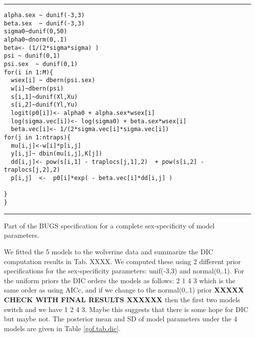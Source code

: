 \begin{panel}[htp]
\centering
\rule[0.15in]{\textwidth}{.03in}
{\small
\begin{verbatim}
alpha.sex ~ dunif(-3,3)
beta.sex  ~ dunif(-3,3)
sigma0~dunif(0,50)
alpha0~dnorm(0,.1)
beta<- (1/(2*sigma*sigma) )
psi ~ dunif(0,1)
psi.sex  ~ dunif(0,1)
for(i in 1:M){
  wsex[i] ~ dbern(psi.sex)
  w[i]~dbern(psi)
  s[i,1]~dunif(Xl,Xu)
  s[i,2]~dunif(Yl,Yu)
  logit(p0[i])<- alpha0 + alpha.sex*wsex[i]
  log(sigma.vec[i])<- log(sigma0) + beta.sex*wsex[i]
  beta.vec[i]<- 1/(2*sigma.vec[i]*sigma.vec[i])
for(j in 1:ntraps){
  mu[i,j]<-w[i]*p[i,j]
  y[i,j]~ dbin(mu[i,j],K[j])
  dd[i,j]<- pow(s[i,1] - traplocs[j,1],2)  + pow(s[i,2] - traplocs[j,2],2)
  p[i,j]  <-  p0[i]*exp( - beta.vec[i]*dd[i,j] )

}
}
\end{verbatim}
}
\rule[-0.15in]{\textwidth}{.03in}
\caption{
Part of the BUGS specification for a complete sex-specificity of model
parameters.   
}
\label{gof.panel.sexmodel}
\end{panel}


We fitted the 5 models to the wolverine data and summarize
the DIC computation results in Tab. XXXX.  We computed these using 2
different prior specifications for the sex-specificity parameters:
unif(-3,3) and normal(0,.1). For the uniform priors the DIC orders the
models as follows: 2 1 4 3 which is the same order as using AICc, and if we change to the normal(0,.1) prior
{\bf XXXXX CHECK WITH FINAL RESULTS XXXXXX}
then the first two models switch and we have 1 2 4 3.  Maybe this
suggests that there is some hope for DIC but maybe not. 
The posterior mean and SD of model parameters under the 4 models are
given in Table \ref{gof.tab.dic}.

